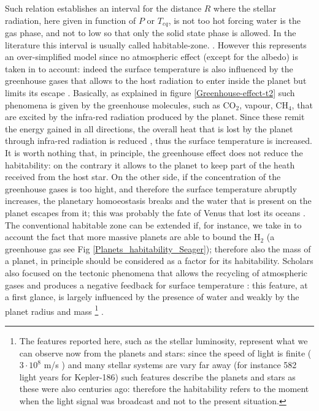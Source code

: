 \documentclass[
12pt, %
a4paper, %
oneside, %
headinclude,footinclude, %
BCOR5mm, %
]{scrartcl}
\begin{document}
Such relation establishes an interval for the distance $R$ where the stellar radiation, here given in function of $P$ or $T_{eq}$, is not too hot forcing water is the gas phase, and not to low so that only the solid state phase is allowed. In the literature this interval is usually called habitable-zone. \cite{kasting1993habitable}. However this represents an over-simplified model since no atmospheric effect (except for the albedo) is taken in to account: indeed the surface temperature is also influenced by the greenhouse gases that allows to the host radiation to enter inside the planet but limits its escape \cite{seager2013exoplanet,forget2014possible}. Basically, as explained in figure \ref{Greenhouse-effect-t2} such phenomena is given by the greenhouse molecules, such as CO$_{2}$, vapour, CH$_{4}$, that are excited by the infra-red radiation produced by the planet. Since these remit the energy gained in all directions, the overall heat that is lost by the planet through infra-red radiation is reduced \cite{pierrehumbert2011infrared}, thus the surface temperature is increased. It is worth nothing that, in principle, the greenhouse effect does not reduce the habitability: on the contrary it allows to the planet to keep part of the heath received from the host star. On the other side, if the concentration of the greenhouse gases is too hight, and therefore the surface temperature abruptly increases, the planetary homoeostasis  \cite{lovelock1974atmospheric,lovelock1982life,caldeira1992life} breaks and the water that is present on the planet escapes from it; this was probably the fate of Venus that lost its oceans \cite{way2016venus,luger2015extreme,seager2013exoplanet}. The conventional habitable zone can be extended if, for instance, we take in to account the fact that more massive planets are able to bound the H$_{2}$ (a greenhouse gas see Fig \ref{Planets_habitability_Seager}); therefore also the mass of a planet, in principle should be considered as a factor for its habitability. Scholars \cite{tackley2012habitable} also focused on the tectonic phenomena that allows the recycling of atmospheric gases and produces a negative feedback for surface temperature \cite{walker1981negative}: this feature, at a first glance, is largely influenced by the presence of water \cite{korenaga2010likelihood,o2007geological} and weakly by the planet radius \cite{o2007geological} and mass \cite{korenaga2010likelihood}\footnote{The features reported here, such as the stellar luminosity, represent what we can observe now from the planets and stars: since the speed of light is finite ($3\cdot10^{8}$ m/s ) and many stellar systems are vary far away (for instance 582 light years for Kepler-186) such features describe the planets and stars as these were also centuries ago: therefore the habitability refers to the moment when the light signal was broadcast and not to the present situation.} .  
  
\end{document}
